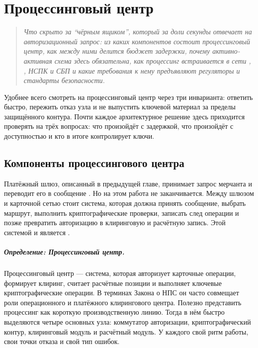 
\chapter{Процессинговый центр}
\label{ch:processing-center}
\begin{quote}
  \itshape
  Что скрыто за \enquote{чёрным ящиком}, который за доли
  секунды отвечает на авторизационный запрос: из каких
  компонентов состоит процессинговый центр, как между ними
  делится бюджет задержки, почему активно-активная схема здесь
  обязательна, как процессинг встраивается в сети
  , , НСПК и СБП
  и какие требования к нему предъявляют регуляторы
  и стандарты безопасности.
\end{quote}

Удобнее всего смотреть на процессинговый центр через три
инварианта: ответить быстро, пережить отказ узла и не выпустить
ключевой материал за пределы защищённого контура. Почти каждое
архитектурное решение здесь приходится проверять на трёх вопросах:
что произойдёт с задержкой, что произойдёт с доступностью
и кто в итоге контролирует ключи.

\section{Компоненты процессингового центра}
\label{sec:pc-components}

Платёжный шлюз, описанный в предыдущей главе, принимает запрос
мерчанта и переводит его в сообщение . Но на этом
работа не заканчивается. Между шлюзом и карточной сетью стоит
система, которая должна принять сообщение, выбрать маршрут,
выполнить криптографические проверки, записать след операции
и позже превратить авторизацию в клиринговую и расчётную
запись. Этой системой и является .

\paragraph{Определение: Процессинговый центр.}
Процессинговый центр --- система, которая авторизует карточные операции, формирует клиринг, считает расчётные позиции и выполняет ключевые криптографические операции. В терминах Закона о НПС он часто совмещает роли операционного и платёжного клирингового центра.
Полезно представить процессинг как короткую производственную
линию. Тогда в нём быстро выделяются четыре основных узла:
коммутатор авторизации, криптографический контур, клиринговый
модуль и расчётный модуль. У каждого свой ритм работы,
свои точки отказа и свой тип ошибок.

